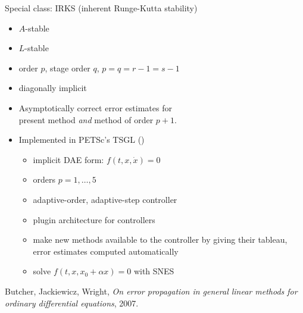 \begin{frame}{Special class: IRKS (inherent Runge-Kutta stability)}
  \begin{itemize}
  \item $A$-stable
  \item $L$-stable
  \item order $p$, stage order $q$, $p=q=r-1=s-1$
  \item diagonally implicit
  \item Asymptotically correct error estimates for \\
    present method \emph{and} method of order $p+1$.
  \item Implemented in PETSc's TSGL ()
    \begin{itemize}
    \item implicit DAE form: $f(t,x,\dot{x}) = 0$
    \item orders $p = 1,\dotsc,5$
    \item adaptive-order, adaptive-step controller
    \item plugin architecture for controllers
    \item make new methods available to the controller by giving their
      tableau, \\ error estimates computed automatically
    \item solve $f(t,x,x_0+\alpha x) = 0$ with SNES
    \end{itemize}
  \end{itemize}
  {\small Butcher, Jackiewicz, Wright, \emph{On error propagation in general linear methods for ordinary differential equations}, 2007.}
\end{frame}
